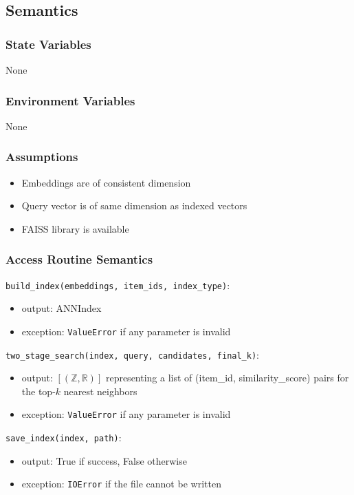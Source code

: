 \documentclass[12pt, titlepage]{article}
\begin{document}
\subsection{Semantics}

\subsubsection{State Variables}
None

\subsubsection{Environment Variables}

None

\subsubsection{Assumptions}

\begin{itemize}
  \item Embeddings are of consistent dimension
  \item Query vector is of same dimension as indexed vectors
  \item FAISS library is available
\end{itemize}

\subsubsection{Access Routine Semantics}

\noindent \texttt{build\_index(embeddings, item\_ids, index\_type)}:
\begin{itemize}
  \item output: ANNIndex
  \item exception: \texttt{ValueError} if any parameter is invalid
\end{itemize}

\noindent \texttt{two\_stage\_search(index, query, candidates, final\_k)}:
\begin{itemize}
  \item output: $[(\mathbb{Z}, \mathbb{R})]$ representing a list of (item\_id, similarity\_score) pairs for the top-$k$ nearest neighbors
  \item exception: \texttt{ValueError} if any parameter is invalid
\end{itemize}

\noindent \texttt{save\_index(index, path)}:
\begin{itemize}
  \item output: True if success, False otherwise
  \item exception: \texttt{IOError} if the file cannot be written
\end{itemize}
\end{document}
